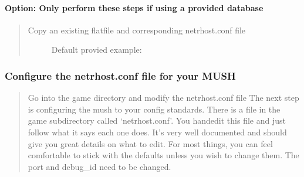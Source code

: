 \documentclass[letterpaper,10pt,english]{sphinxmanual}
\begin{document}
\paragraph{Option: Only perform these steps if using a provided database}
\label{\detokenize{installation:option-only-perform-these-steps-if-using-a-provided-database}}\begin{quote}
\begin{description}
\item[{Copy an existing flatfile and corresponding netrhost.conf file}] \leavevmode
\sphinxAtStartPar
Default provied example:

\begin{sphinxVerbatim}[commandchars=\\\{\}]
    
     
   
     
\end{sphinxVerbatim}

\end{description}
\end{quote}


\subsubsection{Configure the netrhost.conf file for your MUSH}
\label{\detokenize{installation:configure-the-netrhost-conf-file-for-your-mush}}\begin{quote}

\sphinxAtStartPar
Go into the game directory and modify the netrhost.conf file
The next step is configuring the mush to your config standards.
There is a file in the game subdirectory called ‘netrhost.conf’.
You hand\sphinxhyphen{}edit this file and just follow what it says each
one does.  It’s very well documented and should give you
great details on what to edit.  For most things, you can
feel comfortable to stick with the defaults unless you wish
to change them.  The port and debug\_id need to be changed.
\end{quote}
\end{document}
